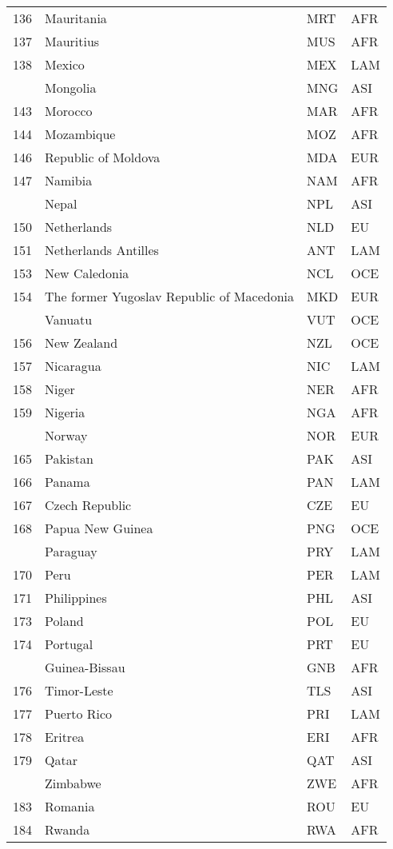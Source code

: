 \documentclass[]{article}
\begin{document}
\begin{longtable}[t]{rlll}
136 & Mauritania & MRT & AFR\\
137 & Mauritius & MUS & AFR\\
138 & Mexico & MEX & LAM\\
\addlinespace
141 & Mongolia & MNG & ASI\\
143 & Morocco & MAR & AFR\\
144 & Mozambique & MOZ & AFR\\
146 & Republic of Moldova & MDA & EUR\\
147 & Namibia & NAM & AFR\\
\addlinespace
149 & Nepal & NPL & ASI\\
150 & Netherlands & NLD & EU\\
151 & Netherlands Antilles & ANT & LAM\\
153 & New Caledonia & NCL & OCE\\
154 & The former Yugoslav Republic of Macedonia & MKD & EUR\\
\addlinespace
155 & Vanuatu & VUT & OCE\\
156 & New Zealand & NZL & OCE\\
157 & Nicaragua & NIC & LAM\\
158 & Niger & NER & AFR\\
159 & Nigeria & NGA & AFR\\
\addlinespace
162 & Norway & NOR & EUR\\
165 & Pakistan & PAK & ASI\\
166 & Panama & PAN & LAM\\
167 & Czech Republic & CZE & EU\\
168 & Papua New Guinea & PNG & OCE\\
\addlinespace
169 & Paraguay & PRY & LAM\\
170 & Peru & PER & LAM\\
171 & Philippines & PHL & ASI\\
173 & Poland & POL & EU\\
174 & Portugal & PRT & EU\\
\addlinespace
175 & Guinea-Bissau & GNB & AFR\\
176 & Timor-Leste & TLS & ASI\\
177 & Puerto Rico & PRI & LAM\\
178 & Eritrea & ERI & AFR\\
179 & Qatar & QAT & ASI\\
\addlinespace
181 & Zimbabwe & ZWE & AFR\\
183 & Romania & ROU & EU\\
184 & Rwanda & RWA & AFR\\

\end{longtable}
\end{document}
